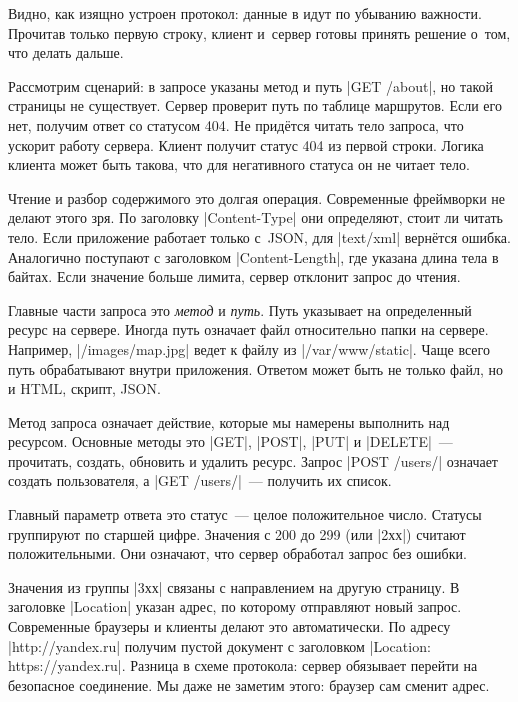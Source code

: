 Видно, как изящно устроен протокол: данные в идут по убыванию важности.
Прочитав только первую строку, клиент и~сервер готовы принять решение о~том, что
делать дальше.


Рассмотрим сценарий: в запросе указаны метод и путь \spverb|GET /about|, но
такой страницы не существует. Сервер проверит путь по таблице маршрутов. Если
его нет, получим ответ со статусом 404. Не прид\"{е}тся читать тело запроса, что
ускорит работу сервера. Клиент получит статус 404 из первой строки. Логика
клиента может быть такова, что для негативного статуса он не читает тело.

Чтение и разбор содержимого это долгая операция. Современные фреймворки не
делают этого зря. По заголовку \spverb|Content-Type| они определяют, стоит ли
читать тело. Если приложение работает только с~JSON, для \spverb|text/xml|
верн\"{е}тся ошибка. Аналогично поступают с заголовком \spverb|Content-Length|, где
указана длина тела в байтах. Если значение больше лимита, сервер отклонит запрос
до чтения.


Главные части запроса это \emph{метод} и \emph{путь}. Путь указывает на
определенный ресурс на сервере. Иногда путь означает файл относительно папки на
сервере. Например, \spverb|/images/map.jpg| ведет к файлу из
\spverb|/var/www/static|. Чаще всего путь обрабатывают внутри приложения.
Ответом может быть не только файл, но и HTML, скрипт, JSON.

Метод запроса означает действие, которые мы намерены выполнить над
ресурсом. Основные методы это \spverb|GET|, \spverb|POST|, \spverb|PUT| и
\spverb|DELETE|~--- прочитать, создать, обновить и удалить ресурс. Запрос
\spverb|POST /users/| означает создать пользователя, а \spverb|GET /users/|~---
получить их список.

Главный параметр ответа это статус~--- целое положительное число. Статусы
группируют по старшей цифре. Значения с 200 до 299 (или \spverb|2хх|) считают
положительными. Они означают, что сервер обработал запрос без ошибки.

Значения из группы \spverb|3хх| связаны с направлением на другую страницу. В
заголовке \spverb|Location| указан адрес, по которому отправляют новый
запрос. Современные браузеры и клиенты делают это автоматически. По адресу
\spverb|http://yandex.ru| получим пустой документ с заголовком
\spverb|Location: https://yandex.ru|. Разница в схеме протокола: сервер обязывает
перейти на безопасное соединение. Мы даже не заметим этого: браузер сам сменит адрес.

